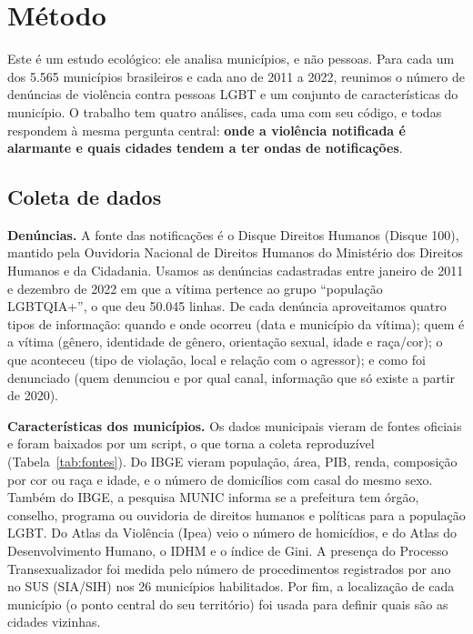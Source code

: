 \documentclass[12pt]{article}
\begin{document}
\section{Método}

Este é um estudo ecológico: ele analisa municípios, e não pessoas. Para cada um dos 5.565 municípios brasileiros e cada ano de 2011 a 2022, reunimos o número de denúncias de violência contra pessoas LGBT e um conjunto de características do município. O trabalho tem quatro análises, cada uma com seu código, e todas respondem à mesma pergunta central: \textbf{onde a violência notificada é alarmante e quais cidades tendem a ter ondas de notificações}.

\subsection{Coleta de dados}

\textbf{Denúncias.} A fonte das notificações é o Disque Direitos Humanos (Disque 100), mantido pela Ouvidoria Nacional de Direitos Humanos do Ministério dos Direitos Humanos e da Cidadania. Usamos as denúncias cadastradas entre janeiro de 2011 e dezembro de 2022 em que a vítima pertence ao grupo ``população LGBTQIA+'', o que deu 50.045 linhas. De cada denúncia aproveitamos quatro tipos de informação: quando e onde ocorreu (data e município da vítima); quem é a vítima (gênero, identidade de gênero, orientação sexual, idade e raça/cor); o que aconteceu (tipo de violação, local e relação com o agressor); e como foi denunciado (quem denunciou e por qual canal, informação que só existe a partir de 2020).

\textbf{Características dos municípios.} Os dados municipais vieram de fontes oficiais e foram baixados por um script, o que torna a coleta reproduzível (Tabela~\ref{tab:fontes}). Do IBGE vieram população, área, PIB, renda, composição por cor ou raça e idade, e o número de domicílios com casal do mesmo sexo. Também do IBGE, a pesquisa MUNIC informa se a prefeitura tem órgão, conselho, programa ou ouvidoria de direitos humanos e políticas para a população LGBT. Do Atlas da Violência (Ipea) veio o número de homicídios, e do Atlas do Desenvolvimento Humano, o IDHM e o índice de Gini. A presença do Processo Transexualizador foi medida pelo número de procedimentos registrados por ano no SUS (SIA/SIH) nos 26 municípios habilitados. Por fim, a localização de cada município (o ponto central do seu território) foi usada para definir quais são as cidades vizinhas.
\end{document}
